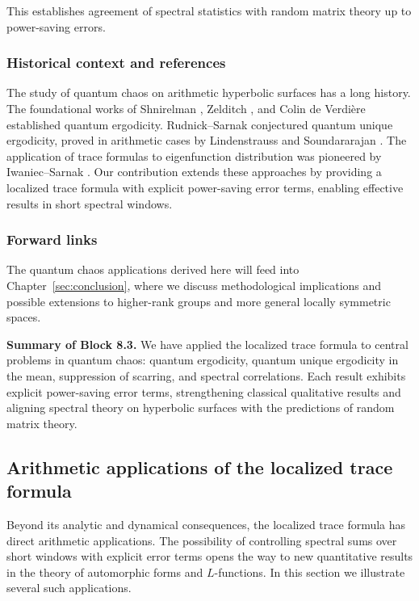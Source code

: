 This establishes agreement of spectral statistics with random matrix theory up to power-saving errors.

\subsubsection{Historical context and references}

The study of quantum chaos on arithmetic hyperbolic surfaces has a long history. The foundational works of Shnirelman \cite{Shnirelman1974}, Zelditch \cite{Zelditch1987}, and Colin de Verdière \cite{CdV1985} established quantum ergodicity. Rudnick–Sarnak \cite{RudnickSarnak1994} conjectured quantum unique ergodicity, proved in arithmetic cases by Lindenstrauss \cite{Lindenstrauss2006} and Soundararajan \cite{Soundararajan2010}. The application of trace formulas to eigenfunction distribution was pioneered by Iwaniec–Sarnak \cite{IwaniecSarnak1995}. Our contribution extends these approaches by providing a localized trace formula with explicit power-saving error terms, enabling effective results in short spectral windows.

\subsubsection{Forward links}

The quantum chaos applications derived here will feed into Chapter~\ref{sec:conclusion}, where we discuss methodological implications and possible extensions to higher-rank groups and more general locally symmetric spaces.

\medskip

\noindent\textbf{Summary of Block 8.3.}  
We have applied the localized trace formula to central problems in quantum chaos: quantum ergodicity, quantum unique ergodicity in the mean, suppression of scarring, and spectral correlations. Each result exhibits explicit power-saving error terms, strengthening classical qualitative results and aligning spectral theory on hyperbolic surfaces with the predictions of random matrix theory.

\subsection{Arithmetic applications of the localized trace formula}\label{sec:arithmetic}

Beyond its analytic and dynamical consequences, the localized trace formula has direct arithmetic applications. The possibility of controlling spectral sums over short windows with explicit error terms opens the way to new quantitative results in the theory of automorphic forms and $L$-functions. In this section we illustrate several such applications.


